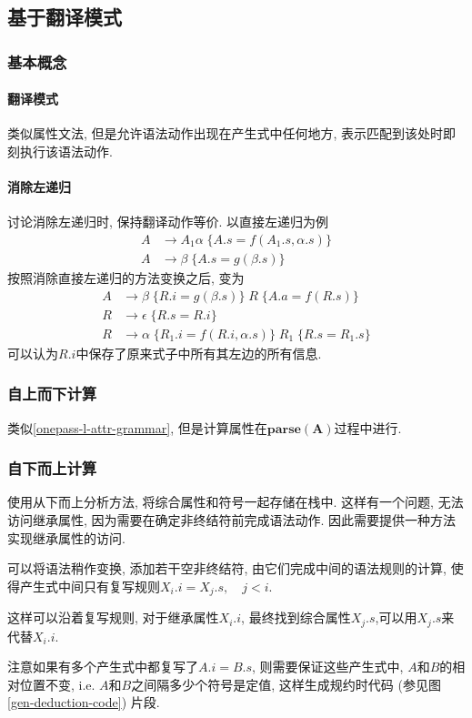\documentclass{ctexart}
\begin{document}
\subsection{基于翻译模式}
\subsubsection{基本概念}
\paragraph{翻译模式} 类似属性文法, 但是允许语法动作出现在产生式中任何地方, 表示匹配到该处时即刻执行该语法动作.
\paragraph{消除左递归} 讨论消除左递归时, 保持翻译动作等价. 以直接左递归为例\begin{align*}
        A & \to A_1 \alpha \; \{ A.s = f(A_1.s, \alpha.s)\}\\
        A & \to \beta  \;     \{ A.s = g(\beta.s)\}
    \end{align*}
    按照消除直接左递归的方法变换之后, 变为 \begin{align*}
        A & \to \beta \;     \{ R.i = g(\beta.s) \} \; R \;             \{A.a = f(R.s)\}\\
        R & \to \epsilon  \; \{ R.s = R.i\}\\
        R & \to \alpha \;    \{ R_1.i = f(R.i, \alpha.s) \}\; R_1  \;   \{ R.s = R_1.s \}
    \end{align*}
    可以认为$R.i$中保存了原来式子中所有其左边的所有信息.
\subsubsection{自上而下计算}
    类似\ref{onepass-l-attr-grammar}, 但是计算属性在$\mathbf{parse(A)}$过程中进行.
\subsubsection{自下而上计算}
    使用从下而上分析方法, 将综合属性和符号一起存储在栈中.
    这样有一个问题, 无法访问继承属性, 因为需要在确定非终结符前完成语法动作.
    因此需要提供一种方法实现继承属性的访问.\par
    可以将语法稍作变换, 添加若干空非终结符,
    由它们完成中间的语法规则的计算, 
    使得产生式中间只有复写规则$X_i.i = X_j.s,\quad j < i$.\par
    这样可以沿着复写规则, 对于继承属性$X_i.i$,
    最终找到综合属性$X_j.s$,可以用$X_j.s$来代替$X_i.i$.\par
    注意如果有多个产生式中都复写了$A.i = B.s$, 则需要保证这些产生式中,
    $A$和$B$的相对位置不变, i.e. $A$和$B$之间隔多少个符号是定值,
    这样生成规约时代码 (参见图\ref{gen-deduction-code}) 片段.
\end{document}
